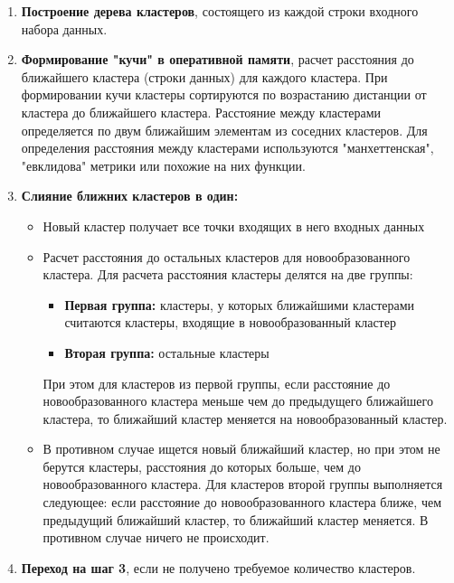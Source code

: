 \documentclass[11pt]{article}
\begin{document}
\begin{enumerate}
    \item \textbf{Построение дерева кластеров}, состоящего из каждой строки входного набора данных.
    
    \item \textbf{Формирование "кучи" в оперативной памяти}, расчет расстояния до ближайшего кластера (строки данных) для каждого кластера. При формировании кучи кластеры сортируются по возрастанию дистанции от кластера до ближайшего кластера. Расстояние между кластерами определяется по двум ближайшим элементам из соседних кластеров. Для определения расстояния между кластерами используются "манхеттенская", "евклидова" метрики или похожие на них функции.
    
    \item \textbf{Слияние ближних кластеров в один:}
    \begin{itemize}
        \item Новый кластер получает все точки входящих в него входных данных
        \item Расчет расстояния до остальных кластеров для новообразованного кластера. Для расчета расстояния кластеры делятся на две группы:
        \begin{itemize}
            \item \textbf{Первая группа:} кластеры, у которых ближайшими кластерами считаются кластеры, входящие в новообразованный кластер
            \item \textbf{Вторая группа:} остальные кластеры
        \end{itemize}
        
        При этом для кластеров из первой группы, если расстояние до новообразованного кластера меньше чем до предыдущего ближайшего кластера, то ближайший кластер меняется на новообразованный кластер.
        
        \item В противном случае ищется новый ближайший кластер, но при этом не берутся кластеры, расстояния до которых больше, чем до новообразованного кластера. Для кластеров второй группы выполняется следующее: если расстояние до новообразованного кластера ближе, чем предыдущий ближайший кластер, то ближайший кластер меняется. В противном случае ничего не происходит.
    \end{itemize}
    
    \item \textbf{Переход на шаг 3}, если не получено требуемое количество кластеров.
\end{enumerate}
\end{document}
